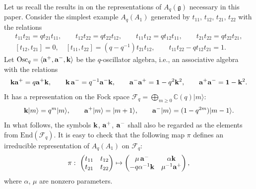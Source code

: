 \documentclass[pdftex]{sigma}
\begin{document}
Let us recall the results in \cite{So2, VS}
on the representations of $A_q(\mathfrak{g})$
necessary in this paper.
Consider the simplest example $A_q(A_1)$ generated by
$t_{11}$, $t_{12}$, $t_{21}$, $t_{22}$
with the relations
\begin{gather*}
t_{11}t_{21} = qt_{21}t_{11},\qquad
t_{12}t_{22} = qt_{22}t_{12},\qquad
t_{11}t_{12} = qt_{12}t_{11},\qquad
t_{21}t_{22} = qt_{22}t_{21},\\
[t_{12},t_{21}]=0,\quad [t_{11},t_{22}]=(q-q^{-1})t_{21}t_{12},
\qquad t_{11}t_{22}-qt_{12}t_{21}=1.
\end{gather*}
Let $\mathrm{Osc}_q =
\langle  {\rm{\bf a}}^+, {\rm{\bf a}}^-, {\rm{\bf k}} \rangle$
be the $q$-oscillator algebra, i.e.,
an associative algebra with the relations
\begin{gather}\label{a:qoa}
{\rm{\bf k}}  {\rm{\bf a}}^+ = q {\rm{\bf a}}^+{\rm{\bf k}},\qquad
{\rm{\bf k}}\,{\rm{\bf a}}^- = q^{-1}{\rm{\bf a}}^-{\rm{\bf k}},\qquad
{\rm{\bf a}}^- {\rm{\bf a}}^+ = {\bf 1}-q^2{\rm{\bf k}}^2,\qquad
{\rm{\bf a}}^+{\rm{\bf a}}^- = {\bf 1}-{\rm{\bf k}}^2.
\end{gather}
It has a representation on
the Fock space
$\mathcal{F}_q = \bigoplus_{m\ge 0}{\mathbb C}(q)|m\rangle$:
\begin{gather}\label{a:akf}
{\rm{\bf k}}|m\rangle = q^m |m\rangle,\qquad
{\rm{\bf a}}^+|m\rangle = |m+1\rangle,\qquad
{\rm{\bf a}}^-|m\rangle = (1-q^{2m})|m-1\rangle.
\end{gather}
In what follows, the symbols
${\rm{\bf k}}$, ${\rm{\bf a}}^+$, ${\rm{\bf a}}^-$ shall
also be regarded as the elements from $\mathrm{End}(\mathcal{F}_q)$.
It is easy to check that the following map $\pi$
def\/ines an irreducible representation of
$A_q(A_1)$ on $\mathcal{F}_q$:
\begin{gather}\label{a:pisl2}
\pi:  \ \begin{pmatrix}
t_{11} & t_{12}\\
t_{21} & t_{22}
\end{pmatrix} \mapsto
\begin{pmatrix}
\mu\,{\rm {\bf a}}^- &  \alpha {\rm {\bf k}}\\
-q\alpha^{-1}{\rm {\bf k}} & \mu^{-1}{\rm {\bf a}}^+
\end{pmatrix},
\end{gather}
where $\alpha$, $\mu$ are nonzero parameters.
\end{document}
